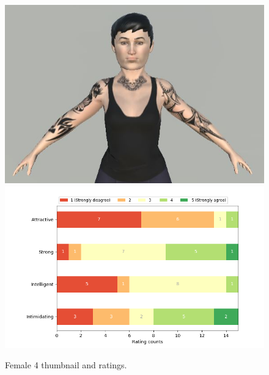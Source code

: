 \begin{figure}[H]
  \includegraphics[width=\linewidth]{Images/Females/4.JPG}
\endminipage\hfill
{}
  \includegraphics[width=\linewidth]{Survey/FRatings/avatar_f4.png}
\endminipage\hfill
\caption{Female 4 thumbnail and ratings.}
\end{figure}


